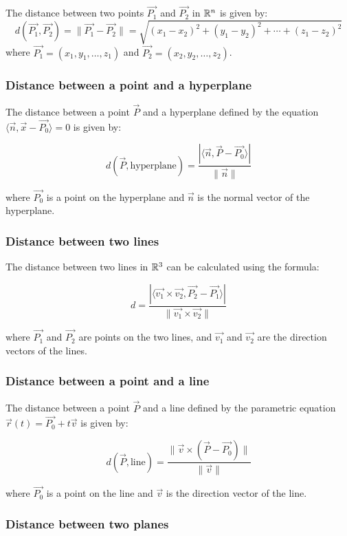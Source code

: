 The distance between two points \(\vec{P_1}\) and \(\vec{P_2}\) in \(\mathbb{R}^n\) is given by:
\[
	d(\vec{P_1}, \vec{P_2}) = \|\vec{P_1} - \vec{P_2}\| = \sqrt{{(x_1 - x_2)}^2 + {(y_1 - y_2)}^2 + \cdots + {(z_1 - z_2)}^2}
\]
where \(\vec{P_1} = (x_1, y_1, \dots,z_1)\) and \(\vec{P_2} = (x_2, y_2, \dots,z_2)\).

\subsubsection{Distance between a point and a hyperplane}

The distance between a point \(\vec{P}\) and a hyperplane defined by the equation \(\langle \vec{n}, \vec{x} - \vec{P_0} \rangle = 0\) is given by:

\[
	d(\vec{P}, \text{hyperplane}) = \frac{|\langle \vec{n}, \vec{P} - \vec{P_0} \rangle|}{\|\vec{n}\|}
\]

where \(\vec{P_0}\) is a point on the hyperplane and \(\vec{n}\) is the normal vector of the hyperplane.

\subsubsection{Distance between two lines}

The distance between two lines in \(\mathbb{R}^3\) can be calculated using the formula:

\[
	d = \frac{|\langle \vec{v_1} \times \vec{v_2}, \vec{P_2} - \vec{P_1} \rangle|}{\|\vec{v_1} \times \vec{v_2}\|}
\]

where \(\vec{P_1}\) and \(\vec{P_2}\) are points on the two lines, and \(\vec{v_1}\) and \(\vec{v_2}\) are the direction vectors of the lines.

\subsubsection{Distance between a point and a line}

The distance between a point \(\vec{P}\) and a line defined by the parametric equation \(\vec{r}(t) = \vec{P_0} + t\vec{v}\) is given by:

\[
	d(\vec{P}, \text{line}) = \frac{\|\vec{v} \times (\vec{P} - \vec{P_0})\|}{\|\vec{v}\|}
\]

where \(\vec{P_0}\) is a point on the line and \(\vec{v}\) is the direction vector of the line.

\subsubsection{Distance between two planes}

